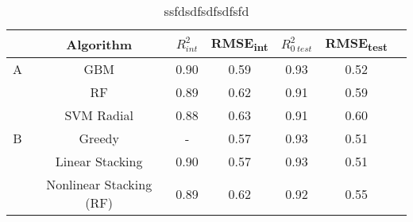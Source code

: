\begin{table}[htb!]
\centering
\begin{tabular}[0.5width=\textwidth]{cccccc p{1cm}}
\hline
&   Algorithm & $R^{2}_{int}$   & RMSE\textsubscript{int} & $R^{2}_{0\ test}$ & RMSE\textsubscript{test}\\
\hline
A &   GBM         &   0.90 &    0.59 & 0.93 & 0.52\\
&   RF          &   0.89 &   0.62  & 0.91 & 0.59\\
  &    SVM Radial &   0.88 &   0.63  & 0.91 & 0.60\\
\hline
B &   Greedy      &   -  &  0.57    &  0.93    &   0.51\\
  &   Linear Stacking & 0.90 & 0.57 & 0.93 & 0.51\\
&   Nonlinear Stacking (RF) & 0.89 & 0.62 & 0.92 & 0.55\\
\hline
\end{tabular}
\caption{ssfdsdfsdfsdfsfd}
\label{}
\end{table}
\newline







